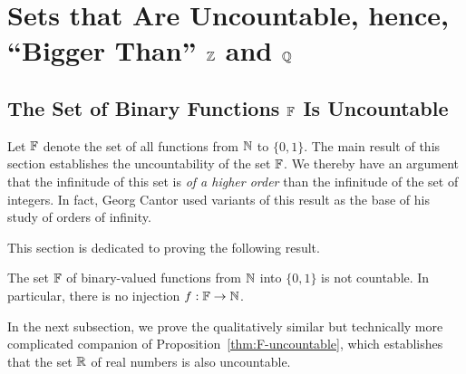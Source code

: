 \section{Sets that Are Uncountable, hence, ``Bigger Than'' $\mathbb{Z}$ and $\mathbb{Q}$}
\label{sec:Q-Z-F-cardinality}
\label{sec:FNS-uncountable}

\subsection{The Set of Binary Functions $\mathbb{F}$ Is Uncountable}
\label{sec:F-uncountable}


Let $\mathbb{F}$ denote the set of all functions from $\mathbb{N}$ to $\{0,1\}$.  The main result of this section establishes the uncountability of the set $\mathbb{F}$.  We thereby have an argument that the infinitude of this set is {\em of a higher order} than the infinitude of the set of integers.  In fact, Georg Cantor used variants of this result as the base of his study of orders of infinity.

\medskip

This section is dedicated to proving the following result.

\begin{prop}
\label{thm:F-uncountable}
The set $\mathbb{F}$ of binary-valued functions from $\mathbb{N}$ into $\{0,1\}$ is not countable.  In particular, there is no injection $f: \mathbb{F} \rightarrow \mathbb{N}$.
\end{prop}

In the next subsection, we prove the qualitatively similar but technically more complicated companion of Proposition~\ref{thm:F-uncountable}, which establishes that the set
$\mathbb{R}$ of real numbers is also uncountable.

 

